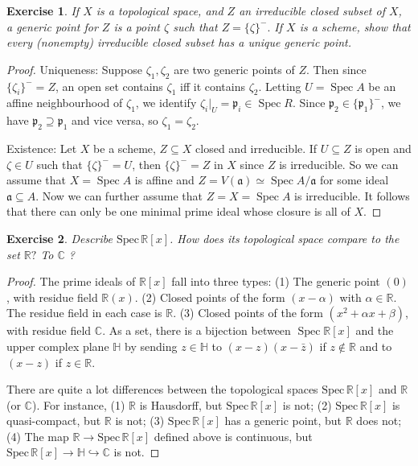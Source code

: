 \documentclass{amsart}
\newtheorem{exe}{Exercise}[subsection]
\begin{document}
\begin{exe}
If $X$ is a topological space, and $Z$ an irreducible closed subset of $X$, a generic point for $Z$ is a point $\zeta$ such that $Z=\{\zeta\}^{-} .$ If $X$ is a scheme, show that every (nonempty) irreducible closed subset has a unique generic point.
\end{exe}
\begin{proof}
Uniqueness: Suppose $\zeta_{1}, \zeta_{2}$ are two generic points of $Z$. Then since $\{\zeta_{i}\}^-=Z$, an open set contains $\zeta_{1}$ iff it contains $\zeta_{2}$. Letting $U=\operatorname{Spec} A$ be an affine neighbourhood of $\zeta_{1}$, we identify $\zeta_{i}|_U=\mathfrak{p}_{i} \in \operatorname{Spec} R$. Since $\mathfrak{p}_{2} \in \{\mathfrak{p}_{1}\}^-$, we have $\mathfrak{p}_{2} \supseteq \mathfrak{p}_{1}$ and vice versa, so $\zeta_{1}=\zeta_{2}$.

Existence: Let $X$ be a scheme, $Z \subseteq X$ closed and irreducible. If $U \subseteq Z$ is open and $\zeta \in U$ such that $\{\zeta\}^-=U$, then $\{\zeta\}^-=Z$ in $X$ since $Z$ is irreducible. So we can assume that $X=\operatorname{Spec} A$ is affine and $Z=V(\mathfrak{a})\simeq\operatorname{Spec} A / \mathfrak{a}$ for some ideal $\mathfrak{a} \subseteq A .$ Now we can further assume that $Z=X=\operatorname{Spec} A$ is irreducible. It follows that there can only be one minimal prime ideal whose closure is all of $X$.
\end{proof}

\begin{exe}
Describe $\mathrm{Spec}\, \mathbb{R}[x]$. How does its topological space compare to the set $\mathbb{R} ?$ To $\mathbb{C}$ ?
\end{exe}

\begin{proof}
The prime ideals of $\mathbb{R}[x]$ fall into three types:
(1) The generic point $(0)$, with residue field $\mathbb{R}(x)$.
(2) Closed points of the form $(x-\alpha)$ with $\alpha \in \mathbb{R}$. The residue field in each case is $\mathbb{R}$.
(3) Closed points of the form $\left(x^{2}+\alpha x+\beta\right)$, with residue field $\mathbb{C}$.
As a set, there is a bijection between $\operatorname{Spec} \mathbb{R}[x]$ and the upper complex plane $\mathbb{H}$ by sending $z \in \mathbb{H}$ to $(x-z)(x-\bar{z})$ if $z \notin \mathbb{R}$ and
to $(x-z)$ if $z \in \mathbb{R}$.

There are quite a lot differences between the topological spaces $\mathrm{Spec}\,\mathbb{R}[x]$ and $\mathbb{R}$ (or $\mathbb{C}$). For instance, (1) $\mathbb{R}$ is Hausdorff, but $\mathrm{Spec}\,\mathbb{R}[x]$ is not; (2) $\mathrm{Spec}\,\mathbb{R}[x]$ is quasi-compact, but $\mathbb{R}$ is not; (3) $\mathrm{Spec}\,\mathbb{R}[x]$ has a generic point, but $\mathbb{R}$ does not;
(4) The map $\mathbb{R}\to\mathrm{Spec}\,\mathbb{R}[x]$ defined above is continuous, but $\mathrm{Spec}\,\mathbb{R}[x]\to\mathbb{H}\hookrightarrow\mathbb{C}$ is not.
\end{proof}
\end{document}
